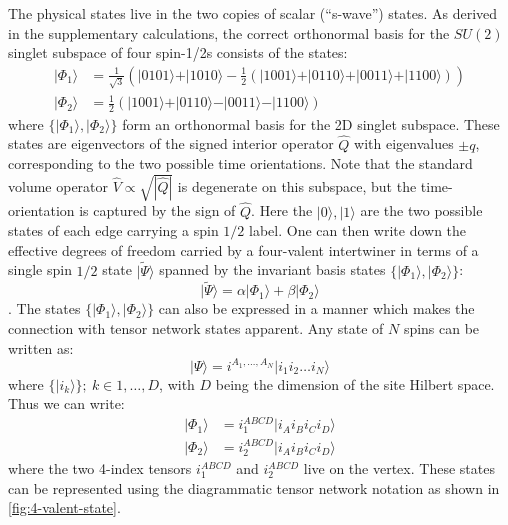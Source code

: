 \documentclass[preprint]{SciPost}
\newcommand{\ket}[1]{\vert #1 \rangle}
\theoremstyle{plain} %
\begin{document}
The physical states live in the two copies of scalar (``s-wave'') states. As derived in the supplementary calculations, the correct orthonormal basis for the $SU(2)$ singlet subspace of four spin-1/2s consists of the states:
\begin{align}\label{eqn:vol-states}
	\ket{\Phi_1} & = \frac{1}{\sqrt{3}} \left( \ket{0101} + \ket{1010} - \frac{1}{2}(\ket{1001} + \ket{0110} + \ket{0011} + \ket{1100}) \right) \nonumber \\
	\ket{\Phi_2} & = \frac{1}{2} \left( \ket{1001} + \ket{0110} - \ket{0011} - \ket{1100} \right)
\end{align}
where $ \{\ket{\Phi_1}, \ket{\Phi_2}\} $ form an orthonormal basis for the 2D singlet subspace. These states are eigenvectors of the signed interior operator $\hat{Q}$ with eigenvalues $\pm q$, corresponding to the two possible time orientations. Note that the standard volume operator $\hat{V} \propto \sqrt{|\hat{Q}|}$ is degenerate on this subspace, but the time-orientation is captured by the sign of $\hat{Q}$.
Here the $ \ket{0}, \ket{1} $ are the two possible states of each edge carrying a spin $ 1/2 $ label. One can then write down the effective degrees of freedom carried by a four-valent intertwiner in terms of a single spin $ 1/2 $ state $ \ket{\tilde\Psi} $ spanned by the invariant basis states $ \{\ket{\Phi_1}, \ket{\Phi_2}\} $:
\begin{equation}\label{key}
	\ket{\tilde \Psi} = \alpha \ket{\Phi_1} + \beta \ket{\Phi_2}
\end{equation}.
The states $ \{\ket{\Phi_1}, \ket{\Phi_2}\} $ can also be expressed in a manner which makes the connection with tensor network states apparent. Any state of $ N $ spins can be written as:
\begin{equation}\label{eqn:spin-n-state}
	\ket{\Psi} = i^{A_1, \ldots, A_N}\ket{i_1 i_2 \ldots i_N}
\end{equation}
where $ \{\ket{i_k}\}; ~ k \in {1,\ldots, D} $, with $ D $ being the dimension of the site Hilbert space. Thus we can write:
\begin{align}\label{eqn:vol-states-3}
	\ket{\Phi_1} & = i_1^{ABCD}\ket{i_A i_B i_C i_D} \nonumber \\
	\ket{\Phi_2} & = i_2^{ABCD}\ket{i_A i_B i_C i_D}
\end{align}
where the two 4-index tensors $ i_1^{ABCD} $ and $ i_2^{ABCD} $ live on the vertex. These states can be represented using the diagrammatic tensor network notation as shown in \autoref{fig:4-valent-state}.
\end{document}
